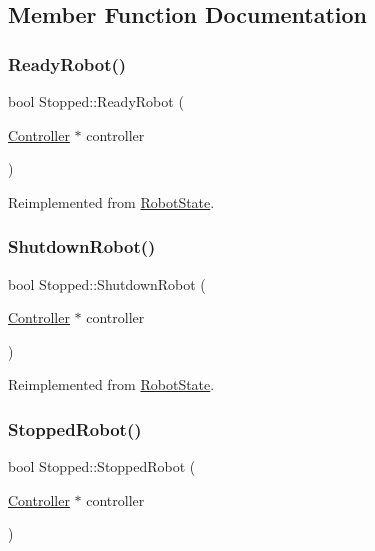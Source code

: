 \subsection{Member Function Documentation}
\mbox{\label{class_stopped_ac47fcf352b8724dd41de6a5db7976b88}} 
\subsubsection{\texorpdfstring{ReadyRobot()}{ReadyRobot()}}
{\footnotesize\ttfamily bool Stopped\+::\+Ready\+Robot (\begin{DoxyParamCaption}\item[{\mbox{\hyperlink{class_controller}{Controller}} $\ast$}]{controller }\end{DoxyParamCaption})\hspace{0.3cm}{\ttfamily [virtual]}}



Reimplemented from \mbox{\hyperlink{class_robot_state_a1e8e2842a62f2666b3c687ec090a3b4f}{Robot\+State}}.

\mbox{\label{class_stopped_ab3e25b89de8b1fead0e6faa766b40da0}} 
\subsubsection{\texorpdfstring{ShutdownRobot()}{ShutdownRobot()}}
{\footnotesize\ttfamily bool Stopped\+::\+Shutdown\+Robot (\begin{DoxyParamCaption}\item[{\mbox{\hyperlink{class_controller}{Controller}} $\ast$}]{controller }\end{DoxyParamCaption})\hspace{0.3cm}{\ttfamily [virtual]}}



Reimplemented from \mbox{\hyperlink{class_robot_state_a9f2cd6a7ec1022e85d6ac160c6f75e54}{Robot\+State}}.

\mbox{\label{class_stopped_adbd9841ac4c2f267e07d683e389593a4}} 
\subsubsection{\texorpdfstring{StoppedRobot()}{StoppedRobot()}}
{\footnotesize\ttfamily bool Stopped\+::\+Stopped\+Robot (\begin{DoxyParamCaption}\item[{\mbox{\hyperlink{class_controller}{Controller}} $\ast$}]{controller }\end{DoxyParamCaption})\hspace{0.3cm}{\ttfamily [virtual]}}



